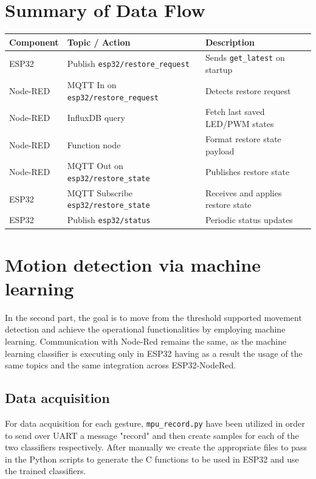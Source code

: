 \documentclass[a4paper,12pt]{article}
\begin{document}
\section{Summary of Data Flow}

\begin{center}
\begin{tabular}{|l|l|l|}
\hline
\textbf{Component} & \textbf{Topic / Action} & \textbf{Description} \\
\hline
ESP32 & Publish \texttt{esp32/restore\_request} & Sends \texttt{get\_latest} on startup \\
Node-RED & MQTT In on \texttt{esp32/restore\_request} & Detects restore request \\
Node-RED & InfluxDB query & Fetch last saved LED/PWM states \\
Node-RED & Function node & Format restore state payload \\
Node-RED & MQTT Out on \texttt{esp32/restore\_state} & Publishes restore state \\
ESP32 & MQTT Subscribe \texttt{esp32/restore\_state} & Receives and applies restore state \\
ESP32 & Publish \texttt{esp32/status} & Periodic status updates \\
\hline
\end{tabular}
\end{center}



\section{Motion detection via machine learning}

In the second part, the goal is to move from the threshold supported movement detection and achieve the 
operational functionalities by employing machine learning. Communication with Node-Red remains 
the same, as the machine learning classifier is executing only in ESP32 having as a result the usage
of the same topics and the same integration across ESP32-NodeRed.

\subsection{Data acquisition}

For data acquisition for each gesture, \texttt{mpu\_record.py} have been utilized in
order to send over UART a message "record" and then create samples for each of the two
classifiers respectively.
After manually we create the appropriate files to pass in the Python scripts to generate the
C functions to be used in ESP32 and use the trained classifiers.
\end{document}

